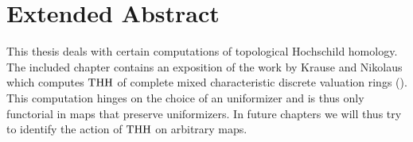 \chapter*{Extended Abstract}

This thesis deals with certain computations of topological Hochschild homology.  \\
The included chapter contains an exposition of the work by Krause and Nikolaus which computes $\operatorname{THH}$ of complete mixed characteristic discrete valuation rings (\cite{KN}). This computation hinges on the choice of an uniformizer and is thus only functorial in maps that preserve uniformizers.
In future chapters we will thus try to identify the action of $\operatorname{THH}$ on arbitrary maps. 
